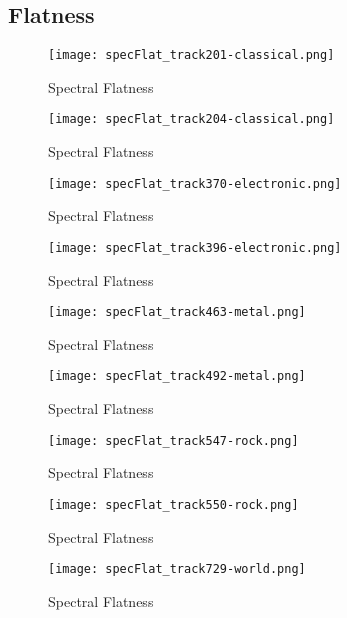 \documentclass{article} %
\begin{document}
\subsection{Flatness}

\begin{figure}[H]
\centering
\texttt{[image: specFlat\_track201-classical.png]}
\caption{Spectral Flatness}
\label{fig:flat201}
\end{figure}

\begin{figure}[H]
\centering
\texttt{[image: specFlat\_track204-classical.png]}
\caption{Spectral Flatness}
\label{fig:flat204}
\end{figure}

\begin{figure}[H]
\centering
\texttt{[image: specFlat\_track370-electronic.png]}
\caption{Spectral Flatness}
\label{fig:flat370}
\end{figure}


\begin{figure}[H]
\centering
\texttt{[image: specFlat\_track396-electronic.png]}
\caption{Spectral Flatness}
\label{fig:flat396}
\end{figure}


\begin{figure}[H]
\centering
\texttt{[image: specFlat\_track463-metal.png]}
\caption{Spectral Flatness}
\label{fig:flat463}
\end{figure}


\begin{figure}[H]
\centering
\texttt{[image: specFlat\_track492-metal.png]}
\caption{Spectral Flatness}
\label{fig:flat492}
\end{figure}


\begin{figure}[H]
\centering
\texttt{[image: specFlat\_track547-rock.png]}
\caption{Spectral Flatness}
\label{fig:flat547}
\end{figure}


\begin{figure}[H]
\centering
\texttt{[image: specFlat\_track550-rock.png]}
\caption{Spectral Flatness}
\label{fig:flat550}
\end{figure}


\begin{figure}[H]
\centering
\texttt{[image: specFlat\_track729-world.png]}
\caption{Spectral Flatness}
\label{fig:flat729}
\end{figure}
\end{document}
